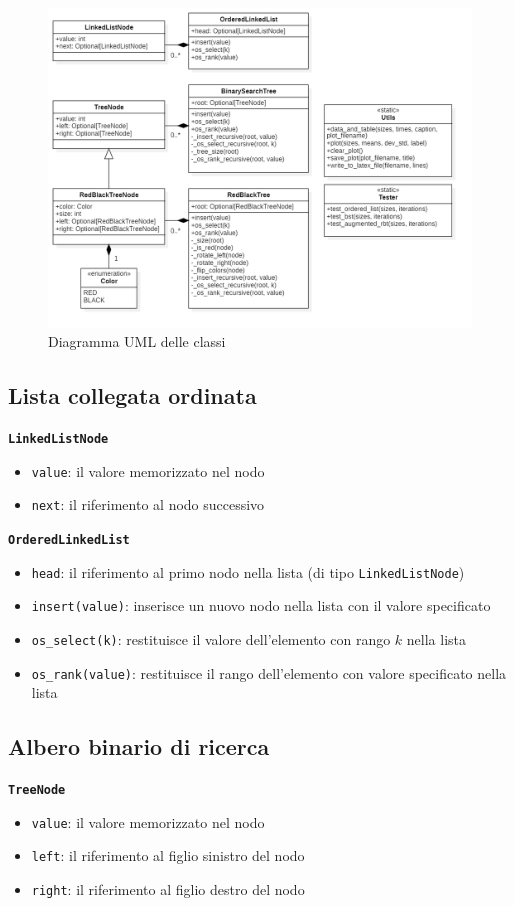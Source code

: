 \documentclass[onecolumn]{article}
\begin{document}
\begin{figure}[h!]
	\includegraphics[width=\linewidth]{classi.png}
	\caption{Diagramma UML delle classi}
	\label{fig:classi}
\end{figure}

\subsection{Lista collegata ordinata}
\texttt{\textbf{LinkedListNode}}
\begin{itemize}
	\setlength\itemsep{0em}
	\item \verb|value|: il valore memorizzato nel nodo
	\item \verb|next|: il riferimento al nodo successivo
\end{itemize}

{\setlength{\parindent}{0em} \texttt{\textbf{OrderedLinkedList}}}
\begin{itemize}
	\setlength\itemsep{0em}
	\item \verb|head|: il riferimento al primo nodo nella lista (di tipo \texttt{LinkedListNode})
	\item \verb|insert(value)|: inserisce un nuovo nodo nella lista con il valore specificato 
	\item \verb|os_select(k)|: restituisce il valore dell'elemento con rango $k$ nella lista
	\item \verb|os_rank(value)|: restituisce il rango dell'elemento con valore specificato nella lista
\end{itemize}

\subsection{Albero binario di ricerca}
\texttt{\textbf{TreeNode}}
\begin{itemize}
	\setlength\itemsep{0em}
	\item \verb|value|: il valore memorizzato nel nodo
	\item \verb|left|: il riferimento al figlio sinistro del nodo
	\item \verb|right|: il riferimento al figlio destro del nodo
\end{itemize}
\end{document}
